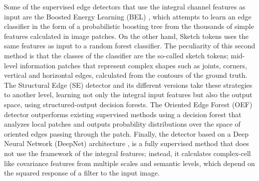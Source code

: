 Some of the supervised edge detectors that use the integral channel features as input are the Boosted Energy Learning (BEL) \citep{Dollar.ZhuowenTu.ea:CVPR:2006}, which attempts to learn an edge classifier in the form of a probabilistic boosting tree from the thousands of simple features calculated in image patches. On the other hand, Sketch tokens \citep{Lim.Zitnick.ea:CVPR:2013} uses the same features as input to a random forest classifier. The peculiarity of this second method is that the classes of the classifier are the so-called sketch tokens; mid-level information patches that represent complex shapes such as joints, corners, vertical and horizontal edges, calculated from the contours of the ground truth. The Structural Edge (SE) detector \citep{Dollar.Zitnick:ICCV:2013} and its different versions \citep{Dollar.Zitnick:PAMI:2015} take these strategies to another level, learning not only the integral input features but also the output space, using structured-output decision forests. The Oriented Edge Forest (OEF) detector \citep{Hallman.Fowlkes:CVPR:2015} outperforms existing supervised methods using a decision forest that analyzes local patches and outputs probability distributions over the space of oriented edges passing through the patch. Finally, the detector based on a Deep Neural Network (DeepNet) architecture \citep{Kivinen.Williams.ea:PMLR:2014}, is a fully supervised method that does not use the framework of the integral features; instead, it calculates complex-cell like covariance features from multiple scales and semantic levels, which depend on the squared response of a filter to the input image. 

